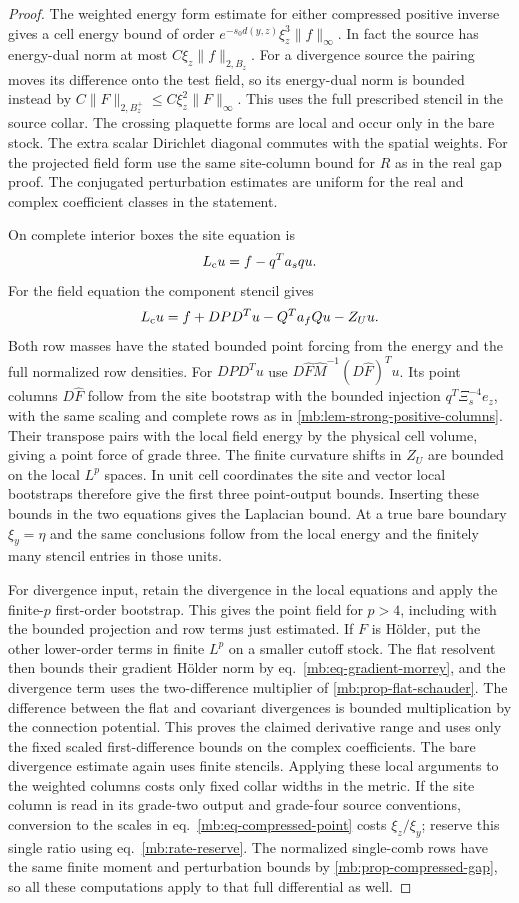 \documentclass[11pt,letterpaper,reqno]{amsart}
\numberwithin{equation}{section}
\renewcommand{\eqref}[1]{\textup{eq.~\ref{#1}}}
\theoremstyle{definition}
\theoremstyle{remark}
\begin{document}
\begin{proof}
The weighted energy form estimate for either compressed
positive inverse gives a cell energy bound of order
\(e^{-s_0d(y,z)}\xi_z^3\|f\|_\infty\). In fact the source has
energy-dual norm at most \(C\xi_z\|f\|_{2,B_z}\). For a
divergence source the pairing moves its difference onto the
test field, so its energy-dual norm is bounded instead by
\(C\|F\|_{2,B_z^+}\le C\xi_z^2\|F\|_\infty\).
This uses the full prescribed stencil in the source collar.
The crossing plaquette forms are local and occur only in
the bare stock. The extra scalar Dirichlet diagonal commutes
with the spatial weights. For the projected field form use
the same site-column bound for \(R\) as in the real gap proof.
The conjugated perturbation estimates are uniform for the
real and complex coefficient classes in the statement.

On complete interior boxes the site equation is
\[
 L_{\rm c}u=f-q^Ta_squ .
\]
For the field equation the component stencil gives
\[
 L_{\rm c}u=f+DPD^Tu-Q^Ta_fQu-Z_Uu .
\]
Both row masses have the stated bounded point forcing from
the energy and the full normalized row densities.
For \(DPD^Tu\) use \(D\widehat F\widehat M^{-1}
(D\widehat F)^Tu\). Its point columns \(D\widehat F\) follow
from the site bootstrap with the bounded injection
\(q^T\Xi_s^{-4}e_z\), with the same scaling and complete
rows as in \cref{mb:lem-strong-positive-columns}. Their
transpose pairs with the local field energy by the physical
cell volume, giving a point force of grade three. The finite
curvature shifts in \(Z_U\) are bounded on the local \(L^p\)
spaces. In unit cell coordinates the site and vector local
bootstraps therefore give the first three point-output bounds.
Inserting these bounds in the two equations gives the
Laplacian bound. At a true bare boundary \(\xi_y=\eta\) and
the same conclusions follow from the local energy and the
finitely many stencil entries in those units.

For divergence input, retain the divergence in the local
equations and apply the finite-\(p\) first-order bootstrap.
This gives the point field for \(p>4\), including with the
bounded projection and row terms just estimated. If \(F\)
is H\"older, put the other lower-order terms in finite \(L^p\)
on a smaller cutoff stock. The flat resolvent then bounds
their gradient H\"older norm by \eqref{mb:eq-gradient-morrey},
and the divergence term uses the two-difference multiplier
of \cref{mb:prop-flat-schauder}. The difference between the
flat and covariant divergences is bounded multiplication by
the connection potential. This proves the claimed derivative
range and uses only the fixed scaled first-difference bounds
on the complex coefficients. The bare divergence estimate
again uses finite stencils. Applying these local arguments
to the weighted columns costs only fixed collar widths in
the metric. If the site column is read in its grade-two
output and grade-four source conventions, conversion to the
scales in \eqref{mb:eq-compressed-point} costs
\(\xi_z/\xi_y\); reserve this single ratio using
\eqref{mb:rate-reserve}. The normalized single-comb rows
have the same finite moment and perturbation bounds by
\cref{mb:prop-compressed-gap}, so all these computations
apply to that full differential as well.


\end{proof}
\end{document}
